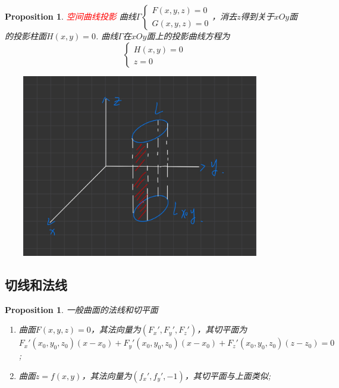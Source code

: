 \documentclass{article}
\newtheorem{proposition}[theorem]{Proposition}
\newcommand{\redt}[1]{\textcolor{red}{#1}}
\begin{document}
\begin{proposition}
\rm \redt{空间曲线投影} 曲线$\Gamma \left\{\begin{array}{ll} F(x,y,z) = 0 \\ G(x,y,z) = 0 \end{array}\right.$，消去$z$得到关于$xOy$面的投影柱面$H(x,y)=0$. 曲线$\Gamma$在$xOy$面上的投影曲线方程为
$$
\left \{
\begin{array}{ll}
H(x,y) = 0\\
z = 0
\end{array} \right. 
$$
\begin{center}
\includegraphics[width=12cm, height=8cm]{images/IMG_0164.JPG}
\end{center}
\end{proposition}

\subsection{切线和法线}

\begin{proposition}
\rm 一般曲面的法线和切平面
\begin{enumerate}
	\item 曲面$F(x,y,z) = 0$，其法向量为$(F_x',F_y',F_z')$，其切平面为$F_x'(x_0,y_0,z_0)(x-x_0) + F_y'(x_0,y_0,z_0)(x-x_0) + F_z'(x_0,y_0,z_0)(z-z_0)= 0$;
	\item 曲面$z=f(x,y)$，其法向量为$(f_x',f_y',-1)$，其切平面与上面类似;
\end{enumerate}
\end{proposition}
\end{document}
